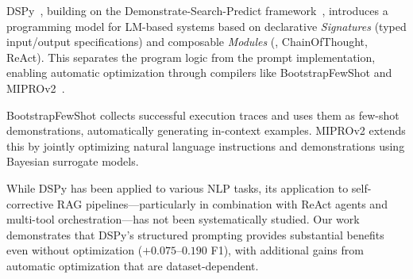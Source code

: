 DSPy~\cite{khattab2024dspy}, building on the Demonstrate-Search-Predict framework~\cite{khattab2023dsp}, introduces a programming model for LM-based systems based on declarative \emph{Signatures} (typed input/output specifications) and composable \emph{Modules} (\eg, ChainOfThought, ReAct).
This separates the program logic from the prompt implementation, enabling automatic optimization through compilers like BootstrapFewShot and MIPROv2~\cite{opsahl2024miprov2}.

BootstrapFewShot collects successful execution traces and uses them as few-shot demonstrations, automatically generating in-context examples.
MIPROv2 extends this by jointly optimizing natural language instructions and demonstrations using Bayesian surrogate models.

While DSPy has been applied to various NLP tasks, its application to self-corrective RAG pipelines---particularly in combination with ReAct agents and multi-tool orchestration---has not been systematically studied.
Our work demonstrates that DSPy's structured prompting provides substantial benefits even without optimization ($+0.075$--$0.190$ F1), with additional gains from automatic optimization that are dataset-dependent.
